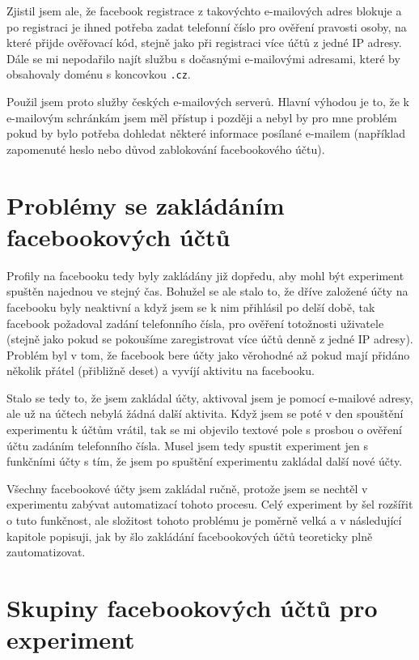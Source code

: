 \documentclass[thesis=M,czech]{FITthesis}[2013/05/10]
\begin{document}
Zjistil jsem ale, že facebook registrace z takovýchto e-mailových adres blokuje a po registraci je ihned potřeba zadat telefonní číslo pro ověření pravosti osoby, na které přijde ověřovací kód, stejně jako při registraci více účtů z jedné IP adresy. Dále se mi nepodařilo najít službu s dočasnými e-mailovými adresami, které by obsahovaly doménu s koncovkou \verb|.cz|. 

Použil jsem proto služby českých e-mailových serverů. Hlavní výhodou je to, že k e-mailovým schránkám jsem měl přístup i později a nebyl by pro mne problém pokud by bylo potřeba dohledat některé informace posílané e-mailem (například zapomenuté heslo nebo důvod zablokování facebookového účtu).

\section{Problémy se zakládáním facebookových účtů}

Profily na facebooku tedy byly zakládány již dopředu, aby mohl být experiment spuštěn najednou ve stejný čas. Bohužel se ale stalo to, že dříve založené účty na facebooku byly neaktivní a když jsem se k nim přihlásil po delší době, tak facebook požadoval zadání telefonního čísla, pro ověření totožnosti uživatele (stejně jako pokud se pokoušíme zaregistrovat více účtů denně z jedné IP adresy). Problém byl v tom, že facebook bere účty jako věrohodné až pokud mají přidáno několik přátel (přibližně deset) a vyvíjí aktivitu na facebooku. 

Stalo se tedy to, že jsem zakládal účty, aktivoval jsem je pomocí e-mailové adresy, ale už na účtech nebylá žádná další aktivita. Když jsem se poté v den spouštění experimentu k účtům vrátil, tak se mi objevilo textové pole s prosbou o ověření účtu zadáním telefonního čísla. Musel jsem tedy spustit experiment jen s funkčními účty s tím, že jsem po spuštění experimentu zakládal další nové účty.

Všechny facebookové účty jsem zakládal ručně, protože jsem se nechtěl v experimentu zabývat automatizací tohoto procesu. Celý experiment by šel rozšířit o tuto funkčnost, ale složitost tohoto problému je poměrně velká a v následující kapitole popisuji, jak by šlo zakládání facebookových účtů teoreticky plně zautomatizovat.

\section{Skupiny facebookových účtů pro experiment}
\end{document}

